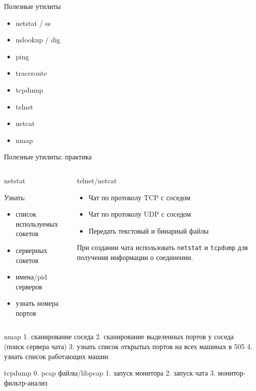 \begin{frame}{Полезные утилиты}
	\begin{center}
		\begin{itemize}
			\item netstat / ss
			\item nslookup / dig
			\item ping
			\item traceroute
			\item tcpdump
			\item telnet
			\item netcat
			\item nmap
		\end{itemize}
	\end{center}

\end{frame}


\begin{frame}{Полезные утилиты: практика}

	\begin{columns}
		\begin{block}{netstat}

			Узнать:
			\begin{itemize}
				\item список используемых сокетов
				\item серверных сокетов
				\item имена/pid серверов
				\item узнать номера портов
			\end{itemize}
		\end{block}
	
		\pause
		\begin{block}{telnet/netcat}

			\begin{itemize}
				\item Чат по протоколу TCP с соседом
				\item Чат по протоколу UDP с соседом
				\item Передать текстовый и бинарный файлы
			\end{itemize}
	
			При создании чата использовать {\tt netstat} и {\tt tcpdump}
			для получения информации о соединении.
		\end{block}
	
	\end{columns}
\end{frame}

nmap
1. сканирование соседа
2. сканирование выделенных портов у соседа (поиск сервера чата) 
3. узнать список открытых портов на всех машинах в 505
4. узнать список  работающих машин

tcpdump
0. pcap файлы/libpcap
1. запуск монитора
2. запуск чата
3. монитор-фильтр-анализ

